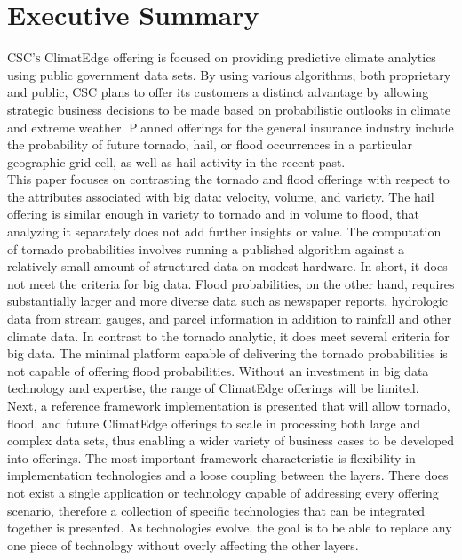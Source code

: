 \section{Executive Summary}
\textsc{CSC's} ClimatEdge\texttrademark{} offering is focused on providing predictive climate analytics using public government data sets. By using various algorithms, both proprietary and public, \textsc{CSC} plans to offer its customers a distinct advantage by allowing strategic business decisions to be made based on probabilistic outlooks in climate and extreme weather. Planned offerings for the general insurance industry include the probability of future tornado, hail, or flood occurrences in a particular geographic grid cell, as well as hail activity in the recent past.\\

This paper focuses on contrasting the tornado and flood offerings with respect to the attributes associated with big data: velocity, volume, and variety. The hail offering is similar enough in variety to tornado and in volume to flood, that analyzing it separately does not add further insights or value. The computation of tornado probabilities involves running a published algorithm against a relatively small amount of structured data on modest hardware. In short, it does not meet the criteria for big data. Flood probabilities, on the other hand, requires substantially larger and more diverse data such as newspaper reports, hydrologic data from stream gauges, and parcel information in addition to rainfall and other climate data. In contrast to the tornado analytic, it does meet several criteria for big data. The minimal platform capable of delivering the tornado probabilities is not capable of offering flood probabilities. Without an investment in big data technology and expertise, the range of ClimatEdge offerings will be limited.\\

Next, a reference framework implementation is presented that will allow tornado, flood, and future ClimatEdge offerings to scale in processing both large and complex data sets, thus enabling a wider variety of business cases to be developed into offerings. The most important framework characteristic is flexibility in implementation technologies and a loose coupling between the layers. There does not exist a single application or technology capable of addressing every offering scenario, therefore a collection of specific technologies that can be integrated together is presented. As technologies evolve, the goal is to be able to replace any one piece of technology without overly affecting the other layers.\\

